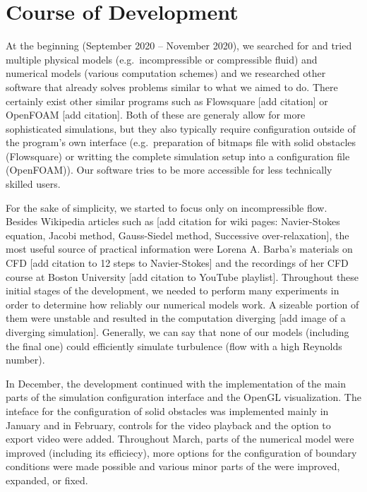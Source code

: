 \documentclass[11pt,a4paper,twoside,openright]{report}
\begin{document}
\section{Course of Development}
At the beginning (September 2020 -- November 2020), we searched for and tried multiple physical models (e.g.\ incompressible or compressible fluid) and numerical models (various computation schemes) and we researched other software that already solves problems similar to what we aimed to do. There certainly exist other similar programs such as Flowsquare [add citation] or OpenFOAM [add citation]. Both of these are generaly allow for more sophisticated simulations, but they also typically require configuration outside of the program's own interface (e.g.\ preparation of bitmaps file with solid obstacles (Flowsquare) or writting the complete simulation setup into a configuration file (OpenFOAM)). Our software tries to be more accessible for less technically skilled users.

For the sake of simplicity, we started to focus only on incompressible flow. Besides Wikipedia articles such as [add citation for wiki pages: Navier-Stokes equation, Jacobi method, Gauss-Siedel method, Successive over-relaxation], the most useful source of practical information were Lorena A. Barba's materials on CFD [add citation to 12 steps to Navier-Stokes] and the recordings of her CFD course at Boston University [add citation to YouTube playlist]. Throughout these initial stages of the development, we needed to perform many experiments in order to determine how reliably our numerical models work. A sizeable portion of them were unstable and resulted in the computation diverging [add image of a diverging simulation]. Generally, we can say that none of our models (including the final one) could efficiently simulate turbulence (flow with a high Reynolds number).

In December, the development continued with the implementation of the main parts of the simulation configuration interface and the OpenGL visualization. The inteface for the configuration of solid obstacles was implemented mainly in January and in February, controls for the video playback and the option to export video were added. Throughout March, parts of the numerical model were improved (including its efficiecy), more options for the configuration of boundary conditions were made possible and various minor parts of the \software{} were improved, expanded, or fixed.
\end{document}
